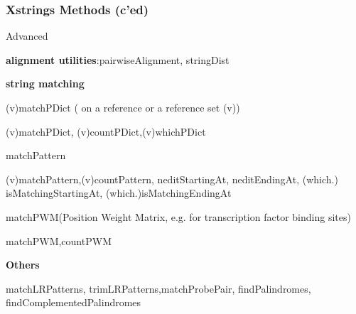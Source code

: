 \documentclass{beamer}
\begin{document}
\begin{frame}
\frametitle{Xstrings Methods (c'ed)}
  \bit
      \item Advanced
        \bit
            \item \textbf{alignment utilities}:pairwiseAlignment, stringDist
            \item \textbf{string matching}
              \bit
                  \item (v)matchPDict ( on a reference or a reference set (v))
                    \bit
                        \item (v)matchPDict, (v)countPDict,(v)whichPDict
                    \eit
                  \item matchPattern
                    \bit
                        \item(v)matchPattern,(v)countPattern, neditStartingAt, neditEndingAt, (which.) isMatchingStartingAt, (which.)isMatchingEndingAt
                    \eit
                  \item matchPWM(Position Weight Matrix, e.g. for transcription factor binding sites)
                    \bit
                        \item matchPWM,countPWM
                    \eit
              \eit
            \item \textbf{Others}
              \bit
                  \item matchLRPatterns, trimLRPatterns,matchProbePair, findPalindromes, findComplementedPalindromes
              \eit
            
        \eit
  \eit
\end{frame}
\end{document}
